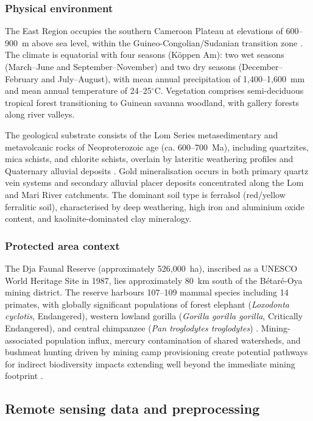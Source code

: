 \documentclass[preprint,12pt,authoryear]{elsarticle}
\begin{document}
\subsubsection{Physical environment}

The East Region occupies the southern Cameroon Plateau at elevations of 600--900~m above sea level, within the Guineo-Congolian/Sudanian transition zone \citep{White1983, Letouzey1985}. The climate is equatorial with four seasons (K\"{o}ppen Am): two wet seasons (March--June and September--November) and two dry seasons (December--February and July--August), with mean annual precipitation of 1,400--1,600~mm and mean annual temperature of 24--25$^{\circ}$C. Vegetation comprises semi-deciduous tropical forest transitioning to Guinean savanna woodland, with gallery forests along river valleys.

The geological substrate consists of the Lom Series metasedimentary and metavolcanic rocks of Neoproterozoic age (ca. 600--700~Ma), including quartzites, mica schists, and chlorite schists, overlain by lateritic weathering profiles and Quaternary alluvial deposits \citep{Mimba2018}. Gold mineralisation occurs in both primary quartz vein systems and secondary alluvial placer deposits concentrated along the Lom and Mari River catchments. The dominant soil type is ferralsol (red/yellow ferralitic soil), characterised by deep weathering, high iron and aluminium oxide content, and kaolinite-dominated clay mineralogy.

\subsubsection{Protected area context}

The Dja Faunal Reserve (approximately 526,000~ha), inscribed as a UNESCO World Heritage Site in 1987, lies approximately 80~km south of the B\'{e}tar\'{e}-Oya mining district. The reserve harbours 107--109 mammal species including 14 primates, with globally significant populations of forest elephant (\textit{Loxodonta cyclotis}, Endangered), western lowland gorilla (\textit{Gorilla gorilla gorilla}, Critically Endangered), and central chimpanzee (\textit{Pan troglodytes troglodytes}) \citep{IUCN2024}. Mining-associated population influx, mercury contamination of shared watersheds, and bushmeat hunting driven by mining camp provisioning create potential pathways for indirect biodiversity impacts extending well beyond the immediate mining footprint \citep{Laurance2006}.


\subsection{Remote sensing data and preprocessing}
\end{document}

